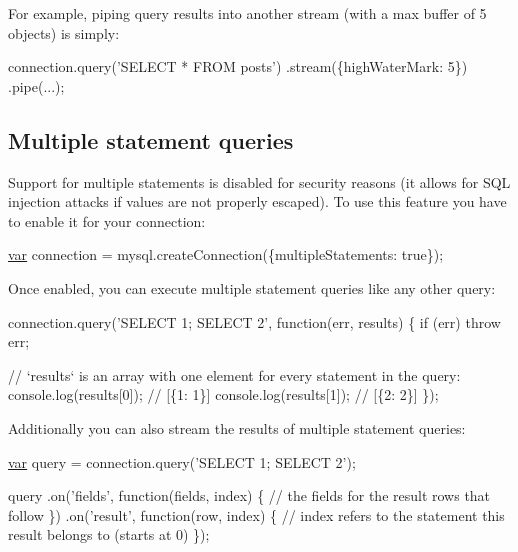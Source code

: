 For example, piping query results into another stream (with a max buffer of 5 objects) is simply\+:


\begin{DoxyCode}
connection.query(\textcolor{stringliteral}{'SELECT * FROM posts'})
  .stream(\{highWaterMark: 5\})
  .pipe(...);
\end{DoxyCode}


\subsection*{Multiple statement queries}

Support for multiple statements is disabled for security reasons (it allows for S\+Q\+L injection attacks if values are not properly escaped). To use this feature you have to enable it for your connection\+:


\begin{DoxyCode}
\hyperlink{018__def_8c_a335628f2e9085305224b4f9cc6e95ed5}{var} connection = mysql.createConnection(\{multipleStatements: \textcolor{keyword}{true}\});
\end{DoxyCode}


Once enabled, you can execute multiple statement queries like any other query\+:


\begin{DoxyCode}
connection.query(\textcolor{stringliteral}{'SELECT 1; SELECT 2'}, \textcolor{keyword}{function}(err, results) \{
  \textcolor{keywordflow}{if} (err) \textcolor{keywordflow}{throw} err;

  \textcolor{comment}{// `results` is an array with one element for every statement in the query:}
  console.log(results[0]); \textcolor{comment}{// [\{1: 1\}]}
  console.log(results[1]); \textcolor{comment}{// [\{2: 2\}]}
\});
\end{DoxyCode}


Additionally you can also stream the results of multiple statement queries\+:


\begin{DoxyCode}
\hyperlink{018__def_8c_a335628f2e9085305224b4f9cc6e95ed5}{var} query = connection.query(\textcolor{stringliteral}{'SELECT 1; SELECT 2'});

query
  .on(\textcolor{stringliteral}{'fields'}, \textcolor{keyword}{function}(fields, index) \{
    \textcolor{comment}{// the fields for the result rows that follow}
  \})
  .on(\textcolor{stringliteral}{'result'}, \textcolor{keyword}{function}(row, index) \{
    \textcolor{comment}{// index refers to the statement this result belongs to (starts at 0)}
  \});
\end{DoxyCode}


